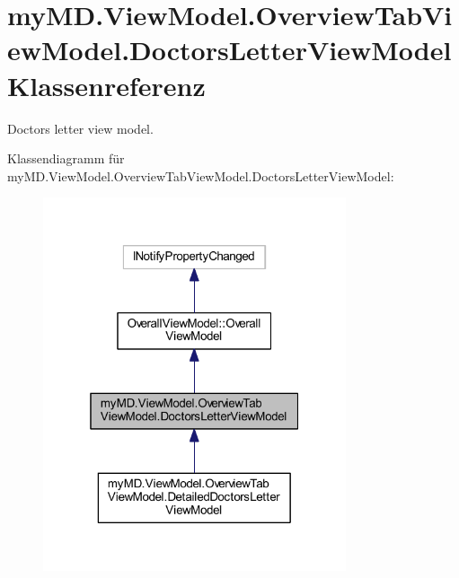 \hypertarget{classmy_m_d_1_1_view_model_1_1_overview_tab_view_model_1_1_doctors_letter_view_model}{}\section{my\+M\+D.\+View\+Model.\+Overview\+Tab\+View\+Model.\+Doctors\+Letter\+View\+Model Klassenreferenz}
\label{classmy_m_d_1_1_view_model_1_1_overview_tab_view_model_1_1_doctors_letter_view_model}


Doctors letter view model.  




Klassendiagramm für my\+M\+D.\+View\+Model.\+Overview\+Tab\+View\+Model.\+Doctors\+Letter\+View\+Model\+:\nopagebreak
\begin{figure}[H]
\begin{center}
\leavevmode
\includegraphics[width=253pt]{classmy_m_d_1_1_view_model_1_1_overview_tab_view_model_1_1_doctors_letter_view_model__inherit__graph}
\end{center}
\end{figure}


